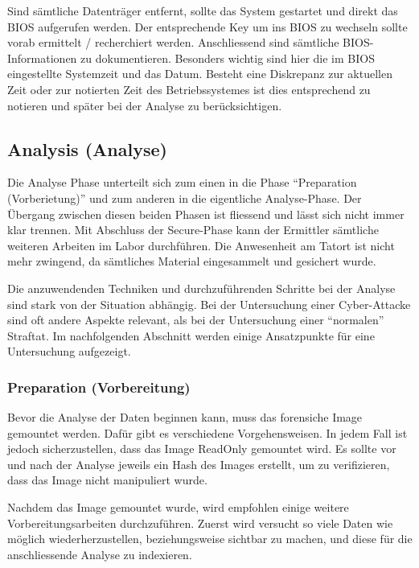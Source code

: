 Sind sämtliche Datenträger entfernt, sollte das System gestartet und direkt das BIOS aufgerufen werden. Der entsprechende Key um ins BIOS zu wechseln sollte vorab ermittelt / recherchiert werden. Anschliessend sind sämtliche BIOS-Informationen zu dokumentieren. Besonders wichtig sind hier die im BIOS eingestellte Systemzeit und das Datum. Besteht eine Diskrepanz zur aktuellen Zeit oder zur notierten Zeit des Betriebssystemes ist dies entsprechend zu notieren und später bei der Analyse zu berücksichtigen.

\subsection{Analysis (Analyse)}
Die Analyse Phase unterteilt sich zum einen in die Phase "`Preparation (Vorberietung)"' und zum anderen in die eigentliche Analyse-Phase. Der Übergang zwischen diesen beiden Phasen ist fliessend und lässt sich nicht immer klar trennen. Mit Abschluss der Secure-Phase kann der Ermittler sämtliche weiteren Arbeiten im Labor durchführen. Die Anwesenheit am Tatort ist nicht mehr zwingend, da sämtliches Material eingesammelt und gesichert wurde.

Die anzuwendenden Techniken und durchzuführenden Schritte bei der Analyse sind stark von der Situation abhängig. Bei der Untersuchung einer Cyber-Attacke sind oft andere Aspekte relevant, als bei der Untersuchung einer "`normalen"' Straftat. Im nachfolgenden Abschnitt werden einige Ansatzpunkte für eine Untersuchung aufgezeigt.

\subsubsection{Preparation (Vorbereitung)}
Bevor die Analyse der Daten beginnen kann, muss das forensiche Image gemountet werden. Dafür gibt es verschiedene Vorgehensweisen. In jedem Fall ist jedoch sicherzustellen, dass das Image ReadOnly gemountet wird. Es sollte vor und nach der Analyse jeweils ein Hash des Images erstellt, um zu verifizieren, dass das Image nicht manipuliert wurde.

Nachdem das Image gemountet wurde, wird empfohlen einige weitere Vorbereitungsarbeiten durchzuführen. Zuerst wird versucht so viele Daten wie möglich wiederherzustellen, beziehungsweise sichtbar zu machen, und diese für die anschliessende Analyse zu indexieren.

